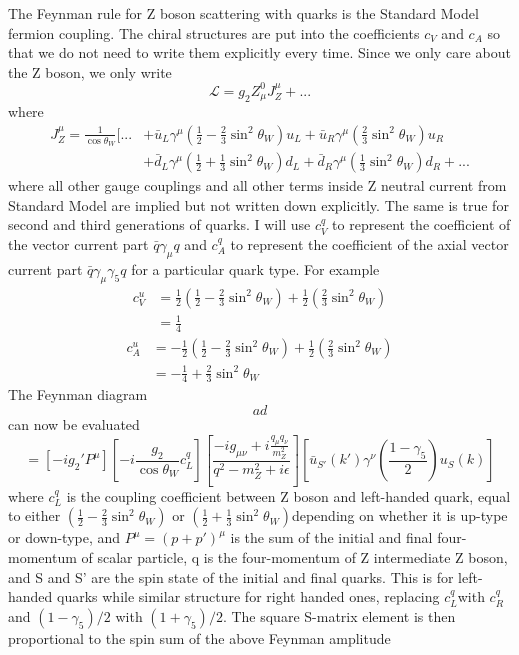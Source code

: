 \documentclass[12pt]{article}
\begin{document}
The Feynman rule for Z boson scattering with quarks is the Standard Model fermion coupling. 
The chiral structures are put into the coefficients $c_V$ and $c_A$ so that we do not need to write them explicitly every time. 
Since we only care about the Z boson, we only write
$$
\mathcal L = g_2 Z_\mu^0 J_Z^\mu  + ...
$$
where 
\begin{equation}
\begin{aligned}
 J_Z^\mu   = \frac{1}{\cos\theta_W} [ ... 
 &+ \bar u_L \gamma^\mu (\frac{1}{2} - \frac{2}{3} \sin^2 \theta_W ) u_L 
+ \bar u_R \gamma^\mu ( \frac{2}{3} \sin^2 \theta_W ) u_R \\
& + \bar d_L \gamma^\mu (\frac{1}{2} + \frac{1}{3} \sin^2 \theta_W ) d_L 
 + \bar d_R \gamma^\mu ( \frac{1}{3} \sin^2 \theta_W ) d_R + ...
 \end{aligned}
 \end{equation}
 where all other gauge couplings and all other terms inside Z neutral current from Standard Model are implied but not written down explicitly. The same is true for second and third generations of quarks. 
 I will use $c_V^q$ to represent the coefficient of the vector current part $\bar q \gamma_\mu q$ and $c_A^q$ to represent the coefficient of the axial vector current part $\bar q \gamma_\mu \gamma_5 q$ for a particular quark type.  
 For example
 \begin{equation}
 \begin{aligned}
 c_V^u 
 &
 = \frac{1}{2 }(\frac{1}{2} - \frac{2}{3} \sin^2 \theta_W ) +  \frac{1}{2}( \frac{2}{3} \sin^2 \theta_W )\\
 &= \frac{1}{4}
 \end{aligned}
  \end{equation}
  \begin{equation}
 \begin{aligned} c_A^u 
 &= - \frac{1}{2}(\frac{1}{2} - \frac{2}{3} \sin^2 \theta_W ) +  \frac{1}{2}( \frac{2}{3} \sin^2 \theta_W )\\
 &= - \frac{1}{4} + \frac{2}{3} \sin^2 \theta_W 
 \end{aligned}
   \end{equation}
The Feynman diagram
$$
ad
$$
can now be evaluated 
$$
= [- i g_2' P^\mu][ - i\frac{g_2}{\cos \theta_W}  c_L^q] [\frac{-i g_{\mu\nu}+i \frac{q_\mu q_\nu }{m_Z^2} }{q^2-m_Z^2 + i\epsilon } ] [\bar u_{S'}(k')   \gamma^\nu  (\frac{1-\gamma_5}{2}) u_S(k)]
$$
where $c_L^q$ is the coupling coefficient between Z boson and left-handed quark, equal to either $ (\frac{1}{2} - \frac{2}{3} \sin^2 \theta_W)$ or $ (\frac{1}{2} + \frac{1}{3} \sin^2 \theta_W)$depending on whether it is up-type or down-type, and $P^\mu =( p+p')^\mu$ is the sum of the initial and final four-momentum of scalar particle, q is the four-momentum of Z intermediate Z boson, and S and S' are the spin state of the initial and final quarks. This is for left-handed quarks while similar structure for right handed ones, replacing $c_L^q$with $c^q_R$ and $(1- \gamma_5)/2$ with $(1+\gamma_5)/2$. The square S-matrix element is then proportional to the spin sum of the above Feynman amplitude
\end{document}
